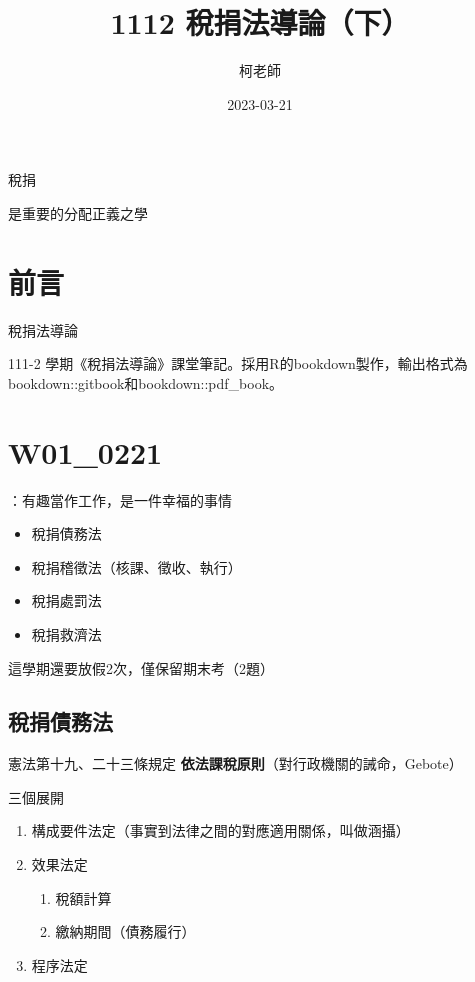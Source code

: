 \documentclass[]{ctexbook}
\title{1112 稅捐法導論（下）}
\author{柯老師}
\date{2023-03-21}
\providecommand{\tightlist}{%
  \setlength{\itemsep}{0pt}\setlength{\parskip}{0pt}}
\begin{document}
\maketitle


\thispagestyle{empty}

\begin{center}
稅捐

是重要的分配正義之學
\end{center}

\setlength{\abovedisplayskip}{-5pt}
\setlength{\abovedisplayshortskip}{-5pt}

{
\setcounter{tocdepth}{2}
\tableofcontents
}
\listoftables
\listoffigures
\hypertarget{ux524dux8a00}{%
\chapter*{前言}\label{ux524dux8a00}}


稅捐法導論

111-2 學期《稅捐法導論》課堂筆記。採用R的bookdown製作，輸出格式為bookdown::gitbook和bookdown::pdf\_book。

\mainmatter

\hypertarget{ux7b2cux4e00ux5468}{%
\chapter{W01\_0221}\label{ux7b2cux4e00ux5468}}

：有趣當作工作，是一件幸福的事情

\begin{itemize}
\tightlist
\item
  稅捐債務法
\item
  稅捐稽徵法（核課、徵收、執行）
\item
  稅捐處罰法
\item
  稅捐救濟法
\end{itemize}

這學期還要放假2次，僅保留期末考（2題）

\hypertarget{ux7a05ux6350ux50b5ux52d9ux6cd5}{%
\section{稅捐債務法}\label{ux7a05ux6350ux50b5ux52d9ux6cd5}}

憲法第十九、二十三條規定
\textbf{依法課稅原則}（對行政機關的誡命，Gebote）

三個展開

\begin{enumerate}
\def\labelenumi{\arabic{enumi}.}
\tightlist
\item
  構成要件法定（事實到法律之間的對應適用關係，叫做涵攝）
\item
  效果法定

  \begin{enumerate}
  \def\labelenumii{\arabic{enumii}.}
  \tightlist
  \item
    稅額計算
  \item
    繳納期間（債務履行）
  \end{enumerate}
\item
  程序法定
\end{enumerate}
\end{document}
